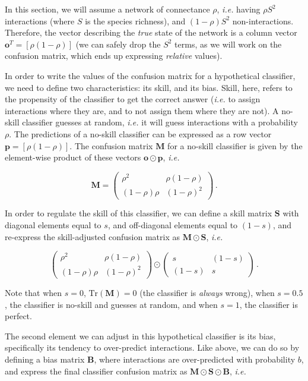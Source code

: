 \documentclass[11pt]{article}
\begin{document}
In this section, we will assume a network of connectance \(\rho\),
\emph{i.e.} having \(\rho S^2\) interactions (where \(S\) is the species
richness), and \((1-\rho) S^2\) non-interactions. Therefore, the vector
describing the \emph{true} state of the network is a column vector
\(\mathbf{o}^T = [\rho (1-\rho)]\) (we can safely drop the \(S^2\)
terms, as we will work on the confusion matrix, which ends up expressing
\emph{relative} values).

In order to write the values of the confusion matrix for a hypothetical
classifier, we need to define two characteristics: its skill, and its
bias. Skill, here, refers to the propensity of the classifier to get the
correct answer (\emph{i.e.} to assign interactions where they are, and
to not assign them where they are not). A no-skill classifier guesses at
random, \emph{i.e.} it will guess interactions with a probability
\(\rho\). The predictions of a no-skill classifier can be expressed as a
row vector \(\mathbf{p} = [\rho (1-\rho)]\). The confusion matrix
\(\mathbf{M}\) for a no-skill classifier is given by the element-wise
product of these vectors \(\mathbf{o} \odot \mathbf{p}\), \emph{i.e.}

\[
\mathbf{M} = \begin{pmatrix}
    \rho^2 & \rho (1-\rho) \\
    (1-\rho) \rho & (1-\rho)^2
\end{pmatrix} \,.
\]

In order to regulate the skill of this classifier, we can define a skill
matrix \(\mathbf{S}\) with diagonal elements equal to \(s\), and
off-diagonal elements equal to \((1-s)\), and re-express the
skill-adjusted confusion matrix as \(\mathbf{M} \odot \mathbf{S}\),
\emph{i.e.}

\[
\begin{pmatrix}
    \rho^2 & \rho (1-\rho) \\
    (1-\rho) \rho & (1-\rho)^2
\end{pmatrix} \odot \begin{pmatrix}
    s & (1-s) \\
    (1-s) & s
\end{pmatrix} \,.
\]

Note that when \(s=0\), \(\text{Tr}(\mathbf{M}) = 0\) (the classifier is
\emph{always} wrong), when \(s=0.5\), the classifier is no-skill and
guesses at random, and when \(s=1\), the classifier is perfect.

The second element we can adjust in this hypothetical classifier is its
bias, specifically its tendency to over-predict interactions. Like
above, we can do so by defining a bias matrix \(\mathbf{B}\), where
interactions are over-predicted with probability \(b\), and express the
final classifier confusion matrix as
\(\mathbf{M}\odot \mathbf{S}\odot \mathbf{B}\), \emph{i.e.}
\end{document}
